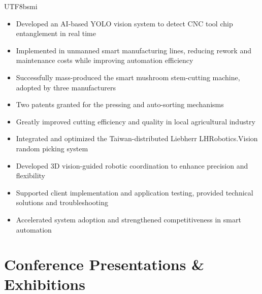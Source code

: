 \documentclass[11pt,a4paper,sans]{moderncv}
\begin{document}
\begin{CJK}{UTF8}{bsmi}
{
\begin{itemize}
\item Developed an AI-based YOLO vision system to detect CNC tool chip entanglement in real time
\item Implemented in unmanned smart manufacturing lines, reducing rework and maintenance costs while improving automation efficiency
\end{itemize}
}

{
\begin{itemize}
\item Successfully mass-produced the smart mushroom stem-cutting machine, adopted by three manufacturers
\item Two patents granted for the pressing and auto-sorting mechanisms
\item Greatly improved cutting efficiency and quality in local agricultural industry
\end{itemize}
}

{
\begin{itemize}
\item Integrated and optimized the Taiwan-distributed Liebherr LHRobotics.Vision random picking system
\item Developed 3D vision-guided robotic coordination to enhance precision and flexibility
\item Supported client implementation and application testing, provided technical solutions and troubleshooting
\item Accelerated system adoption and strengthened competitiveness in smart automation
\end{itemize}
}

\section{Conference Presentations \& Exhibitions}



\end{CJK}
\end{document}
